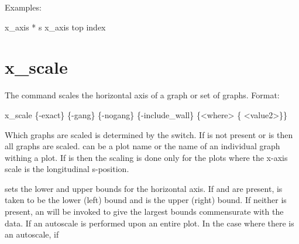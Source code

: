 {{{{{{{{{{Examples:
\begin{example}
  x_axis * s
  x_axis top index
\end{example}

\section{x_scale}
\label{s:x.scale}

The  command scales the horizontal axis of a graph or set of graphs. Format:
\begin{example}
  x_scale \{-exact\} \{-gang\} \{-nogang\} \{-include_wall\} \{<where> \{<value1> <value2>\}\}
\end{example}

Which graphs are scaled is determined by the  switch. If  is not present or
 is \vn{*} then all graphs are scaled.  can be a plot name or the name of an
individual graph withing a plot. If  is  then the scaling is done only for the
plots where the x-axis scale is the longitudinal s-position.

 sets the lower and upper bounds for the horizontal axis.  If  and
 are present,  is taken to be the lower (left) bound and  is
the upper (right) bound. If neither is present, an  will be invoked to give the
largest bounds commensurate with the data. If an autoscale is performed upon an entire plot. In the
case where there is an autoscale, if \vn{plot%
the chosen scales will be the same for all graphs. That is, a single scale is calculated so that all
the data of all the graphs is within the plot region. The affect of \vn{plot%
be overridden by using the \vn{-gang} or \vn{-nogang} switches.

How a graph is scaled is determined in part by the setting of the \vn{bounds} parameter in the
\vn{x} component of the graph. See \vn{s:line.symb} for more details. The \vn{-exact} switch, if
present, will set \vn{bounds} to \vn{"EXACT"}. which means that \tao will use the min and
max bounds as given by \vn{<value1>} and \vn{<value2>} and not try to find ``nice'' values near the
given ones. If \vn{<value1>} and \vn{<value2>} are not given, and if \vn{bounds} is set to
\vn{"EXACT"}, \tao will set \vn{bounds} to \vn{"GENERAL"}. Note: To set the axis \vn{bounds}
directly, use the \vn{set graph} command.

}}}}}}}}}}}}
